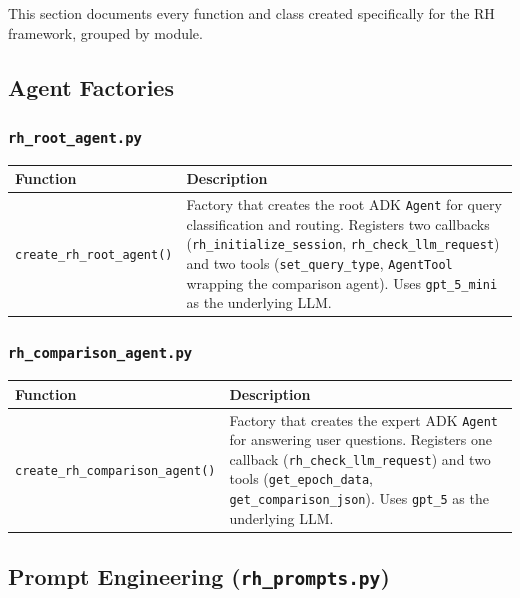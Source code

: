 \documentclass[11pt, a4paper]{article}
\begin{document}
This section documents every function and class created specifically for the
RH framework, grouped by module.

\subsection{Agent Factories}

\subsubsection{\texttt{rh\_root\_agent.py}}

\begin{longtable}{p{5.5cm} p{9cm}}
\toprule
\textbf{Function} & \textbf{Description} \\
\midrule
\texttt{create\_rh\_root\_agent()} &
    Factory that creates the root ADK \texttt{Agent} for query
    classification and routing.  Registers two callbacks
    (\texttt{rh\_initialize\_session}, \texttt{rh\_check\_llm\_request})
    and two tools (\texttt{set\_query\_type}, \texttt{AgentTool} wrapping
    the comparison agent).  Uses \textcolor{reused}{\texttt{gpt\_5\_mini}}
    as the underlying LLM. \\
\bottomrule
\end{longtable}

\subsubsection{\texttt{rh\_comparison\_agent.py}}

\begin{longtable}{p{5.5cm} p{9cm}}
\toprule
\textbf{Function} & \textbf{Description} \\
\midrule
\texttt{create\_rh\_comparison\_agent()} &
    Factory that creates the expert ADK \texttt{Agent} for answering user
    questions.  Registers one callback (\texttt{rh\_check\_llm\_request})
    and two tools (\texttt{get\_epoch\_data}, \texttt{get\_comparison\_json}).
    Uses \textcolor{reused}{\texttt{gpt\_5}} as the underlying LLM. \\
\bottomrule
\end{longtable}


\subsection{Prompt Engineering (\texttt{rh\_prompts.py})}
\end{document}
